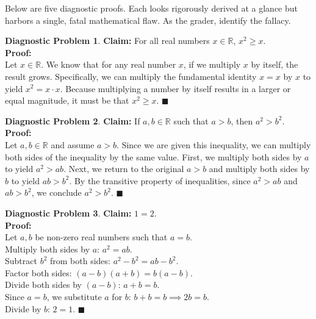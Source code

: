 \documentclass[11pt]{article}
\theoremstyle{definition}
\newtheorem{flawprob}{Diagnostic Problem}
\theoremstyle{remark}
\begin{document}
\begin{itemize}
Below are five diagnostic proofs. Each looks rigorously derived at a glance but harbors a single, fatal mathematical flaw. As the grader, identify the fallacy.

\begin{flawprob}
\textbf{Claim:} For all real numbers $x \in \mathbb{R}$, $x^2 \ge x$. \\
\textbf{Proof:} \\
Let $x \in \mathbb{R}$. We know that for any real number $x$, if we multiply $x$ by itself, the result grows. Specifically, we can multiply the fundamental identity $x = x$ by $x$ to yield $x^2 = x \cdot x$. Because multiplying a number by itself results in a larger or equal magnitude, it must be that $x^2 \ge x$. $\blacksquare$
\end{flawprob}

\begin{flawprob}
\textbf{Claim:} If $a, b \in \mathbb{R}$ such that $a > b$, then $a^2 > b^2$. \\
\textbf{Proof:} \\
Let $a, b \in \mathbb{R}$ and assume $a > b$. Since we are given this inequality, we can multiply both sides of the inequality by the same value. First, we multiply both sides by $a$ to yield $a^2 > ab$. Next, we return to the original $a > b$ and multiply both sides by $b$ to yield $ab > b^2$. By the transitive property of inequalities, since $a^2 > ab$ and $ab > b^2$, we conclude $a^2 > b^2$. $\blacksquare$
\end{flawprob}

\begin{flawprob}
\textbf{Claim:} $1 = 2$. \\
\textbf{Proof:} \\
Let $a, b$ be non-zero real numbers such that $a = b$. \\
Multiply both sides by $a$: $a^2 = ab$. \\
Subtract $b^2$ from both sides: $a^2 - b^2 = ab - b^2$. \\
Factor both sides: $(a - b)(a + b) = b(a - b)$. \\
Divide both sides by $(a - b)$: $a + b = b$. \\
Since $a = b$, we substitute $a$ for $b$: $b + b = b \implies 2b = b$. \\
Divide by $b$: $2 = 1$. $\blacksquare$
\end{flawprob}


\end{itemize}
\end{document}
